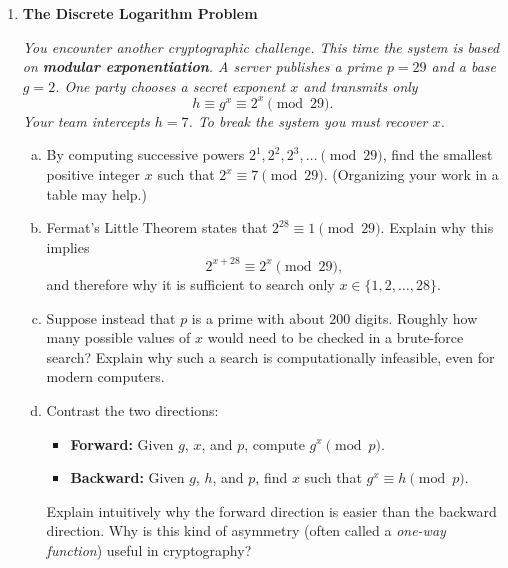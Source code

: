 \documentclass[12pt]{article}
\begin{document}
\begin{enumerate}
\begin{enumerate}[(a)]
\item Use your result to compute $3^{-1} \pmod{7}$.

\item Explain why this method cannot be used to find multiplicative
inverses modulo $26$.  What property of $26$ is responsible, and why
does it matter?

\end{enumerate}

\bigskip 

\item \textbf{The Discrete Logarithm Problem}

\textit{You encounter another cryptographic challenge.
This time the system is based on \textbf{modular exponentiation}.
A server publishes a prime $p = 29$ and a base $g = 2$.
One party chooses a secret exponent $x$ and transmits only}
\[
  h \equiv g^x \equiv 2^x \pmod{29}.
\]
\textit{Your team intercepts $h = 7$.  To break the system you must
recover $x$.}

\begin{enumerate}[(a)]

\item By computing successive powers $2^1, 2^2, 2^3, \dots \pmod{29}$,
find the smallest positive integer $x$ such that
$2^x \equiv 7 \pmod{29}$.  (Organizing your work in a table may help.)

\item Fermat's Little Theorem states that
$2^{28} \equiv 1 \pmod{29}$.
Explain why this implies
\[
2^{x+28} \equiv 2^x \pmod{29},
\]
and therefore why it is sufficient to search only
$x \in \{1,2,\dots,28\}$.

\item Suppose instead that $p$ is a prime with about $200$ digits.
Roughly how many possible values of $x$ would need to be checked in a
brute-force search?  Explain why such a search is computationally
infeasible, even for modern computers.

\newpage 


\item Contrast the two directions:
\begin{itemize}
\item \textbf{Forward:} Given $g$, $x$, and $p$, compute $g^x \pmod{p}$.
\item \textbf{Backward:} Given $g$, $h$, and $p$, find $x$ such that
$g^x \equiv h \pmod{p}$.
\end{itemize}
Explain intuitively why the forward direction is easier than the
backward direction.  Why is this kind of asymmetry (often called a
\emph{one-way function}) useful in cryptography?


\end{enumerate}
\end{enumerate}
\end{document}
